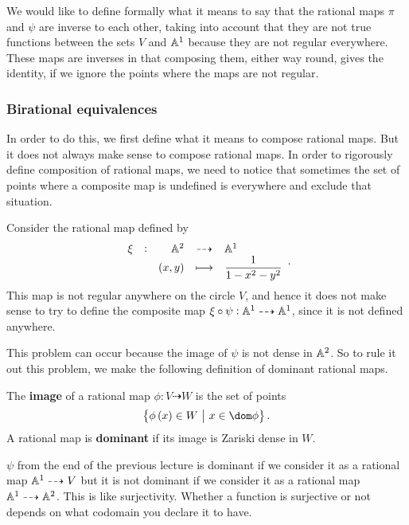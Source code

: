 We would like to define formally what it means to say that the rational maps $ \pi $ and $ \psi $ are inverse to each other, taking into account that they are not true functions between the sets $ V $ and $ \AA^1 $ because they are not regular everywhere. These maps are inverses in that composing them, either way round, gives the identity, if we ignore the points where the maps are not regular.

\subsubsection{Birational equivalences}


In order to do this, we first define what it means to compose rational maps. But it does not always make sense to compose rational maps. In order to rigorously define composition of rational maps, we need to notice that sometimes the set of points where a composite map is undefined is everywhere and exclude that situation.

\begin{example*}
Consider the rational map defined by
$$ \rational[\xi]{\AA^2}{\AA^1}{\br{x, y}}{\dfrac{1}{1 - x^2 - y^2}}. $$
This map is not regular anywhere on the circle $ V $, and hence it does not make sense to try to define the composite map $ \xi \circ \psi : \AA^1 \dashrightarrow \AA^1 $, since it is not defined anywhere.
\end{example*}

This problem can occur because the image of $ \psi $ is not dense in $ \AA^2 $. So to rule it out this problem, we make the following definition of dominant rational maps.

\begin{definition*}
The \textbf{image} of a rational map $ \phi : V \dashrightarrow W $ is the set of points
$$ \cbr{\phi\br{x} \in W \st x \in \dom \phi}. $$
A rational map is \textbf{dominant} if its image is Zariski dense in $ W $.
\end{definition*}

\begin{example*}
$ \psi $ from the end of the previous lecture is dominant if we consider it as a rational map $ \AA^1 \dashrightarrow V $ but it is not dominant if we consider it as a rational map $ \AA^1 \dashrightarrow \AA^2 $. This is like surjectivity. Whether a function is surjective or not depends on what codomain you declare it to have.
\end{example*}

